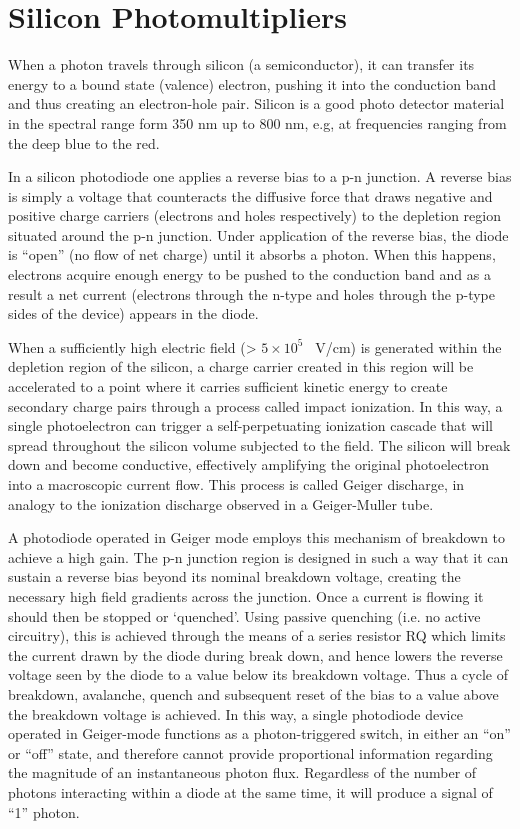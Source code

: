 
\section{Silicon Photomultipliers}
\label{sec.sipm}

When a photon travels through silicon (a semiconductor), it can transfer its energy to a bound state (valence) electron, pushing it into the conduction band and thus creating an electron-hole pair. Silicon is a good photo detector material in the spectral range form 350 nm up to 800 nm, e.g, at frequencies ranging from the deep blue to the red. 

In a silicon photodiode one applies a reverse bias to a p-n junction. A reverse bias is simply a voltage that counteracts the diffusive force that draws negative and positive charge carriers (electrons and holes respectively) to the depletion region situated around the p-n junction. Under application of the reverse bias, the diode is ``open'' (no flow of net charge) until it absorbs a photon. When this happens, electrons acquire enough energy to be pushed to the conduction band and as a  result a net current (electrons through the n-type and holes through the p-type sides of the device) appears in the diode.

When a sufficiently high electric field (> $5 \times 10^5$~ V/cm) is generated within the depletion region of the silicon, a charge carrier created in this region will be accelerated to a point where it carries sufficient kinetic energy to create secondary charge pairs through a process called impact ionization. In this way, a single photoelectron can trigger a self-perpetuating ionization cascade that will spread throughout the silicon volume subjected to the field. The silicon will break down and become conductive, effectively amplifying the original photoelectron into a macroscopic current flow. This process is called Geiger discharge, in analogy to the ionization discharge observed in a Geiger-Muller tube. 

A photodiode operated in Geiger mode employs this mechanism of breakdown to achieve a high gain. The p-n junction region is designed in such a way that it can sustain a reverse bias beyond its nominal breakdown voltage, creating the necessary high field gradients across the junction. Once a current is flowing it should then be stopped or ‘quenched’. Using passive quenching (i.e. no active circuitry), this is achieved through the means of a series resistor RQ which limits the current drawn by the diode during break down, and hence lowers the reverse voltage seen by the diode to a value below its breakdown voltage. Thus a cycle of breakdown, avalanche, quench and subsequent reset of the bias to a value above the breakdown voltage is achieved. In this way, a single photodiode device operated in Geiger-mode functions as a photon-triggered switch, in either an ``on'' or ``off'' state, and therefore cannot provide proportional information regarding the magnitude of an instantaneous photon flux. Regardless of the number of photons interacting within a diode at the same time, it will produce a signal of ``1'' photon.



